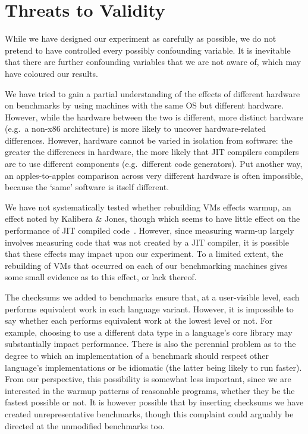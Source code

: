 \documentclass[acmlarge]{acmart}\settopmatter{printfolios=true}
\newcommand{\kalibera}{Kalibera \& Jones\xspace}
\begin{document}
\section{Threats to Validity}
\label{sec:threats}

While we have designed our experiment as carefully as possible, we do not
pretend to have controlled every possibly confounding variable. It
is inevitable that there are further confounding variables that
we are not aware of, which may have coloured our results.

We have tried to gain a partial understanding of the effects of different
hardware on benchmarks by using machines with the same OS but
different hardware. However, while the hardware between the two is
different, more distinct hardware (e.g.~a non-x86 architecture)
is more likely to uncover hardware-related differences.
However, hardware cannot be varied in isolation from software:
the greater the differences in hardware, the more likely that JIT compilers
compilers are to use different components (e.g.~different code generators).
Put another way, an apples-to-apples comparison across very different
hardware is often impossible, because the `same' software is itself different.

We have not systematically tested whether rebuilding VMs effects warmup, an
effect noted by \kalibera, though which seems to have little effect on
the performance of JIT compiled code~\cite{barrett15approaches}. However, since measuring warm-up largely
involves measuring code that was not created by a JIT compiler, it is possible
that these effects may impact upon our experiment. To a limited extent, the
rebuilding of VMs that occurred on each of our benchmarking machines gives
some small evidence as to this effect, or lack thereof.

The checksums we added to benchmarks ensure that, at a user-visible level, each
performs equivalent work in each language variant. However, it is impossible to
say whether each performs equivalent work at the lowest level or not. For
example, choosing to use a different data type in a language's core library may
substantially impact performance. There is also the perennial problem as to the
degree to which an implementation of a benchmark should respect other
language's implementations or be idiomatic (the latter being likely to
run faster). From our perspective, this possibility is somewhat less important,
since we are interested in the warmup patterns of reasonable programs,
whether they be the fastest possible or not. It is however possible that by
inserting checksums we have created unrepresentative benchmarks, though
this complaint could arguably be directed at the unmodified benchmarks too.
\end{document}
